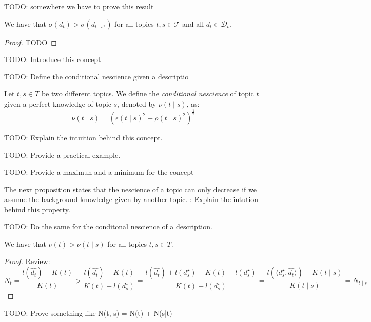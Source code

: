 {\color{red} TODO: somewhere we have to prove this result}

\begin{proposition}
We have that $\sigma(d_t) > \sigma(d_{t \mid s^\star})$ for all topics $t,s \in \mathcal{T}$ and all $d_t \in \mathcal{D}_t$.
\end{proposition}
\begin{proof}
{\color{red} TODO}
\end{proof}

{\color{red} TODO: Introduce this concept}

{\color{red} TODO: Define the conditional nescience given a descriptio}

\begin{definition} Let $t,s\in T$ be two different topics. We define the \emph{conditional nescience} of topic $t$ given a perfect knowledge of topic $s$, denoted by $\nu( t \mid s)$, as: 
\[
\nu(t \mid s) = \left( \epsilon\left( t \mid s \right)^2 + \rho\left( t \mid s \right)^2 \right) ^ \frac{1}{2}
\]
\end{definition}

{\color{red} TODO: Explain the intuition behind this concept.}

{\color{red} TODO: Provide a practical example.}

{\color{red} TODO: Provide a maximun and a minimum for the concept}

The next proposition states that the nescience of a topic can only decrease if we assume the background knowledge given by another topic. {\color{red}: Explain the intution behind this property.}

{\color{red} TODO: Do the same for the conditonal nescience of a description.}

\begin{proposition}
We have that $\nu(t) > \nu(t \mid s)$ for all topics $t, s \in T$.
\end{proposition}
\begin{proof}
{\color{red} Review:}
\[
N_t = \frac{l\left(\hat{d_t}\right) - K(t)}{K(t)} > \frac{l\left(\hat{d_t}\right) - K(t)}{K(t) + l\left(d_s^\star \right)} = \frac{l\left(\hat{d_t}\right) + l\left(d_s^\star \right) - K(t) - l\left(d_s^\star \right)}{K(t) + l\left(d_s^\star \right)} = \frac{l\left(\langle d_s^\star, \hat{d_t} \rangle \right)-K(t \mid s)}{K(t \mid s)} = N_{t \mid s}
\]
\end{proof}

{\color{red} TODO: Prove something like N(t, s) = N(t) + N(s|t)}

